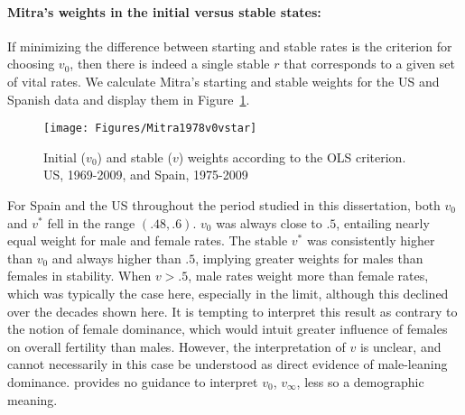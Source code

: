\paragraph{Mitra's weights in the initial versus stable states: } If minimizing
the difference between starting and stable rates is the criterion for choosing $v_0$, 
then there is indeed a single stable $r$ that
corresponds to a given set of vital rates. We calculate Mitra's starting and
stable weights for the US and Spanish data and display them
in Figure~\ref{fig:Mitra1978v0vstar}.

\begin{figure}[ht!]
        \centering  
          \caption{Initial ($v_0$) and stable ($v$) weights according to the OLS
          criterion. US, 1969-2009, and Spain, 1975-2009 
          \citet{mitra1978derivation}}
           \quad
           \texttt{[image: Figures/Mitra1978v0vstar]}
          \label{fig:Mitra1978v0vstar}
\end{figure}

For Spain and the US throughout the period studied in this dissertation, both
$v_0$ and $v^\ast$ fell in the range $(.48,.6)$. $v_0$ was always
close to $.5$, entailing nearly equal weight for male and female rates.
The stable $v^\ast$ was consistently higher than $v_0$ and always higher than
$.5$, implying greater weights for males than females in stability. When $v > .5$, male rates weight
more than female rates, which was typically the case here, especially in the
limit, although this declined over the decades shown here. It is
tempting to interpret this result as contrary to the notion of female dominance,
which would intuit greater influence of females on overall fertility than
males. However, the interpretation of $v$ is unclear, and cannot necessarily in
this case be understood as direct evidence of male-leaning dominance.
\citet{mitra1978derivation} provides no guidance to interpret $v_0$, $v_\infty$,
less so a demographic meaning. 
\FloatBarrier
